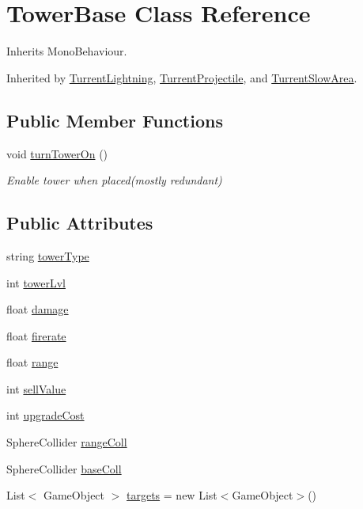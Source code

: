 \hypertarget{class_tower_base}{}\section{Tower\+Base Class Reference}
\label{class_tower_base}


Inherits Mono\+Behaviour.



Inherited by \hyperlink{class_turrent_lightning}{Turrent\+Lightning}, \hyperlink{class_turrent_projectile}{Turrent\+Projectile}, and \hyperlink{class_turrent_slow_area}{Turrent\+Slow\+Area}.

\subsection*{Public Member Functions}
\begin{DoxyCompactItemize}
\item 
void \hyperlink{class_tower_base_a4f863c377c8114a913e90c9ccaee5e32}{turn\+Tower\+On} ()
\begin{DoxyCompactList}\small\item\em Enable tower when placed(mostly redundant) \end{DoxyCompactList}\end{DoxyCompactItemize}
\subsection*{Public Attributes}
\begin{DoxyCompactItemize}
\item 
string \hyperlink{class_tower_base_a3fa651023fb588b0af4289d2f26f365a}{tower\+Type}
\item 
int \hyperlink{class_tower_base_acf978511d4a2929681acb1cae2201165}{tower\+Lvl}
\item 
float \hyperlink{class_tower_base_a55b31ff450647d6d44603cd32b1bc5a1}{damage}
\item 
float \hyperlink{class_tower_base_a7b3c6de17168a02da71acd4124451b7e}{firerate}
\item 
float \hyperlink{class_tower_base_a9f335f125b84beaafb405210d8b24066}{range}
\item 
int \hyperlink{class_tower_base_a23fbeef8aae7efc0a9b32f73fc1496d6}{sell\+Value}
\item 
int \hyperlink{class_tower_base_a267ec042fc28a481673c2d2b293b31d5}{upgrade\+Cost}
\item 
Sphere\+Collider \hyperlink{class_tower_base_a67924eeea2cd41476516edf36ebea332}{range\+Coll}
\item 
Sphere\+Collider \hyperlink{class_tower_base_a69dbc881925ec5df0452143b2bf76175}{base\+Coll}
\item 
List$<$ Game\+Object $>$ \hyperlink{class_tower_base_a2ce10cd9123a0bd4025d4f23e1d1c6c1}{targets} = new List$<$Game\+Object$>$()
\end{DoxyCompactItemize}
